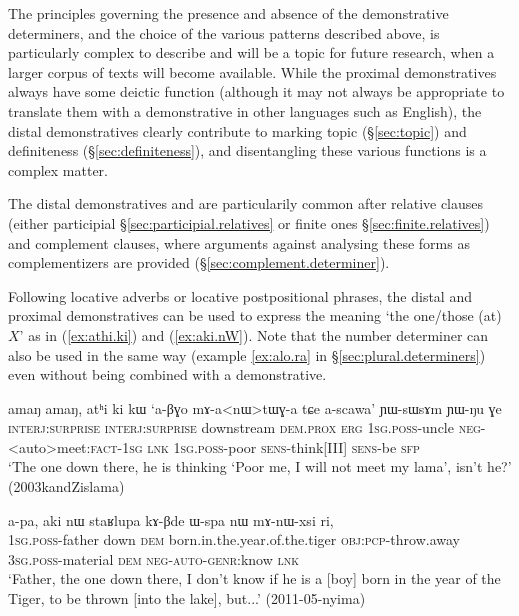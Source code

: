 The principles governing the presence and absence of the demonstrative determiners, and the choice of the various patterns described above, is particularly complex to describe and will be a topic for future research, when a larger corpus of texts will become available. While the proximal demonstratives always have some deictic function (although it may not always be appropriate to translate them with a demonstrative in other languages such as English), the distal demonstratives clearly contribute to marking topic (§\ref{sec:topic}) and definiteness (§\ref{sec:definiteness}), and disentangling these various functions is a complex matter.

The distal demonstratives  and  are particularily common after relative clauses (either participial §\ref{sec:participial.relatives} or finite ones §\ref{sec:finite.relatives}) and complement clauses, where arguments against analysing these forms as complementizers are provided (§\ref{sec:complement.determiner}).

Following locative adverbs or locative postpositional phrases, the distal and proximal demonstratives can be used to express the meaning `the one/those (at) $X$' as in (\ref{ex:athi.ki}) and (\ref{ex:aki.nW}). Note that the number determiner  can also be used in the same way (example \ref{ex:alo.ra} in §\ref{sec:plural.determiners}) even without being combined with a demonstrative.

\begin{exe}
\ex \label{ex:athi.ki}
\gll amaŋ amaŋ, atʰi ki kɯ `a-βɣo mɤ-a<nɯ>tɯɣ-a tɕe a-scawa' ɲɯ-sɯsɤm ɲɯ-ŋu ɣe \\
\textsc{interj}:\textsc{surprise} \textsc{interj}:\textsc{surprise}  downstream \textsc{dem}.\textsc{prox} \textsc{erg} \textsc{1sg}.\textsc{poss}-uncle \textsc{neg}-<auto>meet:\textsc{fact}-\textsc{1sg} \textsc{lnk} \textsc{1sg}.\textsc{poss}-poor \textsc{sens}-think[III] \textsc{sens}-be \textsc{sfp} \\
\glt `The one down there, he is thinking `Poor me, I will not meet my lama', isn't he?' (2003kandZislama)
\end{exe}

\begin{exe}
\ex \label{ex:aki.nW}
\gll a-pa, aki nɯ staʁlupa kɤ-βde ɯ-spa nɯ mɤ-nɯ-xsi ri, \\
\textsc{1sg}.\textsc{poss}-father down \textsc{dem} born.in.the.year.of.the.tiger \textsc{obj}:\textsc{pcp}-throw.away \textsc{3sg}.\textsc{poss}-material \textsc{dem} \textsc{neg}-\textsc{auto}-\textsc{genr}:know \textsc{lnk} \\
\glt `Father, the one down there, I don't know if he is a [boy] born in the year of the Tiger, to be thrown [into the lake], but...' (2011-05-nyima)
\end{exe}

